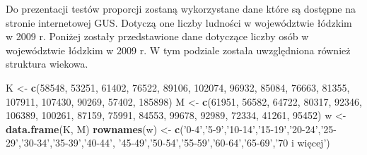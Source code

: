 \documentclass[polish,]{book}
\newenvironment{Shaded}{\begin{snugshade}}{\end{snugshade}}
\newcommand{\DecValTok}[1]{\textcolor[rgb]{0.00,0.00,0.81}{#1}}
\newcommand{\KeywordTok}[1]{\textcolor[rgb]{0.13,0.29,0.53}{\textbf{#1}}}
\newcommand{\NormalTok}[1]{#1}
\newcommand{\StringTok}[1]{\textcolor[rgb]{0.31,0.60,0.02}{#1}}
\begin{document}
Do prezentacji testów proporcji zostaną wykorzystane dane które są dostępne na
stronie internetowej GUS. Dotyczą one liczby ludności w województwie łódzkim w
2009 r.
Poniżej zostały przedstawione dane dotyczące liczby osób w województwie łódzkim
w 2009 r. W tym podziale została uwzględniona również struktura wiekowa.

\begin{Shaded}
\begin{Highlighting}[]
\NormalTok{K <-}\StringTok{ }\KeywordTok{c}\NormalTok{(}\DecValTok{58548}\NormalTok{, }\DecValTok{53251}\NormalTok{, }\DecValTok{61402}\NormalTok{, }\DecValTok{76522}\NormalTok{, }\DecValTok{89106}\NormalTok{, }\DecValTok{102074}\NormalTok{, }\DecValTok{96932}\NormalTok{, }\DecValTok{85084}\NormalTok{, }\DecValTok{76663}\NormalTok{,}
       \DecValTok{81355}\NormalTok{, }\DecValTok{107911}\NormalTok{, }\DecValTok{107430}\NormalTok{, }\DecValTok{90269}\NormalTok{, }\DecValTok{57402}\NormalTok{, }\DecValTok{185898}\NormalTok{)}
\NormalTok{M <-}\StringTok{ }\KeywordTok{c}\NormalTok{(}\DecValTok{61951}\NormalTok{, }\DecValTok{56582}\NormalTok{, }\DecValTok{64722}\NormalTok{, }\DecValTok{80317}\NormalTok{, }\DecValTok{92346}\NormalTok{, }\DecValTok{106389}\NormalTok{, }\DecValTok{100261}\NormalTok{, }\DecValTok{87159}\NormalTok{, }\DecValTok{75991}\NormalTok{,}
       \DecValTok{84553}\NormalTok{, }\DecValTok{99678}\NormalTok{, }\DecValTok{92989}\NormalTok{, }\DecValTok{72334}\NormalTok{, }\DecValTok{41261}\NormalTok{, }\DecValTok{95452}\NormalTok{)}
\NormalTok{w <-}\StringTok{ }\KeywordTok{data.frame}\NormalTok{(K, M)}
\KeywordTok{rownames}\NormalTok{(w) <-}\StringTok{ }\KeywordTok{c}\NormalTok{(}\StringTok{'0-4'}\NormalTok{,}\StringTok{'5-9'}\NormalTok{,}\StringTok{'10-14'}\NormalTok{,}\StringTok{'15-19'}\NormalTok{,}\StringTok{'20-24'}\NormalTok{,}\StringTok{'25-29'}\NormalTok{,}\StringTok{'30-34'}\NormalTok{,}\StringTok{'35-39'}\NormalTok{,}\StringTok{'40-44'}\NormalTok{,}
                 \StringTok{'45-49'}\NormalTok{,}\StringTok{'50-54'}\NormalTok{,}\StringTok{'55-59'}\NormalTok{,}\StringTok{'60-64'}\NormalTok{,}\StringTok{'65-69'}\NormalTok{,}\StringTok{'70 i więcej'}\NormalTok{)}
\end{Highlighting}
\end{Shaded}
\end{document}
